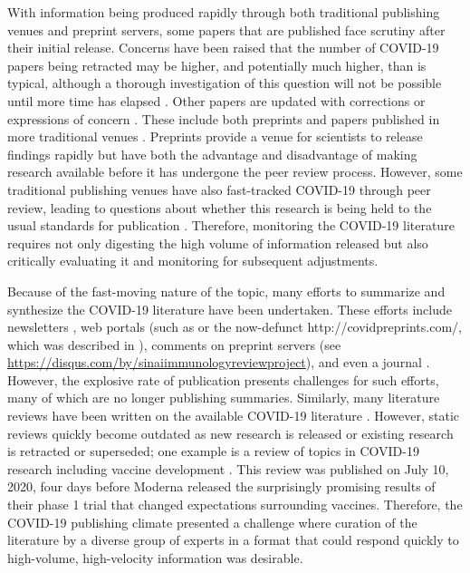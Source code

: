 \documentclass[twocolumn]{ceurart}
\begin{document}
With information being produced rapidly through both traditional publishing venues and preprint servers, some papers that are published face scrutiny after their initial release.
Concerns have been raised that the number of COVID-19 papers being retracted may be higher, and potentially much higher, than is typical, although a thorough investigation of this question will not be possible until more time has elapsed \citep{ZUk10707, caxpZEmy}.
Other papers are updated with corrections or expressions of concern \citep{caxpZEmy, hfAF6aDr}.
These include both preprints and papers published in more traditional venues \citep{hfAF6aDr, paRLhIdE}.
Preprints provide a venue for scientists to release findings rapidly but have both the advantage and disadvantage of making research available before it has undergone the peer review process.
However, some traditional publishing venues have also fast-tracked COVID-19 through peer review, leading to questions about whether this research is being held to the usual standards for publication \citep{1Dez1ZOc5}.
Therefore, monitoring the COVID-19 literature requires not only digesting the high volume of information released but also critically evaluating it and monitoring for subsequent adjustments.

Because of the fast-moving nature of the topic, many efforts to summarize and synthesize the COVID-19 literature have been undertaken.
These efforts include newsletters \citetext{\citealp{d204tUzq}; \citealp{JdWiPJCL}}, web portals (such as \citep{m4B8roc9, 1CBWvhTdy} or the now-defunct http://covidpreprints.com/, which was described in \citep{paRLhIdE}), comments on preprint servers \citep{YZ4cHNuH} (see \url{https://disqus.com/by/sinaiimmunologyreviewproject}), and even a journal \citep{oBoqEGzZ}.
However, the explosive rate of publication presents challenges for such efforts, many of which are no longer publishing summaries.
Similarly, many literature reviews have been written on the available COVID-19 literature \citep{I2EsJmfs, 5x25saIz, evtsR3C5, 18eCxyLhx, SAE5ME3N, xOs5ctsW}.
However, static reviews quickly become outdated as new research is released or existing research is retracted or superseded; one example is a review of topics in COVID-19 research including vaccine development \citep{xOs5ctsW}.
This review was published on July 10, 2020, four days before Moderna released the surprisingly promising results of their phase 1 trial \citep{wiGjCZC8} that changed expectations surrounding vaccines.
Therefore, the COVID-19 publishing climate presented a challenge where curation of the literature by a diverse group of experts in a format that could respond quickly to high-volume, high-velocity information was desirable.
\end{document}
